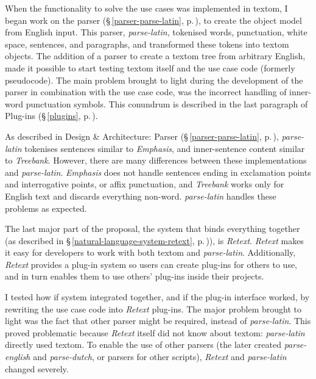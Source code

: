 When the functionality to solve the use cases was implemented in \gls{textom},
  I began work on the parser (§\,\ref{parser-parse-latin},
  p.\,\pageref{parser-parse-latin}), to create the object model from
  English input.
This parser, \emph{parse-latin}, tokenised words, punctuation, white space,
  sentences, and paragraphs, and transformed these tokens into \gls{textom}
  objects.
The addition of a parser to create a \gls{textom} tree from arbitrary
  English, made it possible to start testing \gls{textom} itself and the use
  case code (formerly pseudocode).
The main problem brought to light during the development of the parser in
  combination with the use case code, was the incorrect
  handling of inner-word punctuation symbols.
This conundrum is described in the last paragraph of Plug-ins
  (§\,\ref{plugins}, p.\,\pageref{plugins}).

As described in Design \& Architecture: Parser (§\,\ref{parser-parse-latin},
  p.\,\pageref{parser-parse-latin}), \emph{parse-latin} tokenises sentences
  similar to \emph{Emphasis}, and inner-sentence content similar
  to \emph{Treebank}.
However, there are many differences between these implementations and
  \emph{parse-latin}.
\emph{Emphasis} does not handle sentences ending in exclamation
  points and interrogative points, or affix punctuation, and \emph{Treebank}
  works only for English text and discards everything non-word.
\emph{parse-latin} handles these problems as expected.

The last major part of the proposal, the system that binds everything
  together (as described in §\,\ref{natural-language-system-retext},
  p.\,\pageref{natural-language-system-retext})), is \emph{Retext}.
\emph{Retext} makes it easy for developers to work with both \gls{textom}
  and \emph{parse-latin}.
Additionally, \emph{Retext} provides a plug-in system so users can create
  plug-ins for others to use, and in turn enables them to use others'
  plug-ins inside their projects.

I tested how if system integrated together, and if the plug-in interface
  worked, by rewriting the use case code into \emph{Retext} plug-ins.
The major problem brought to light was the fact that other parser might be
  required, instead of \emph{parse-latin}.
This proved problematic because \emph{Retext} itself did not know about
  \gls{textom}: \emph{parse-latin} directly used \gls{textom}.
To enable the use of other parsers (the later created \emph{parse-english}
  and \emph{parse-dutch}, or parsers for other scripts),
  \emph{Retext} and \emph{parse-latin} changed severely.

